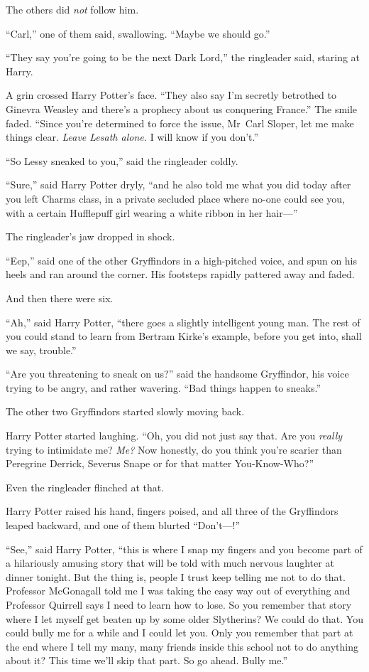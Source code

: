 The others did \emph{not} follow him.

“Carl,” one of them said, swallowing. “Maybe we should go.”

“They say you’re going to be the next Dark Lord,” the ringleader said, staring at Harry.

A grin crossed Harry Potter’s face. “They also say I’m secretly betrothed to Ginevra Weasley and there’s a prophecy about us conquering France.” The smile faded. “Since you’re determined to force the issue, Mr~Carl Sloper, let me make things clear. \emph{Leave Lesath alone.} I will know if you don’t.”

“So Lessy sneaked to you,” said the ringleader coldly.

“Sure,” said Harry Potter dryly, “and he also told me what you did today after you left Charms class, in a private secluded place where no-one could see you, with a certain Hufflepuff girl wearing a white ribbon in her hair—”

The ringleader’s jaw dropped in shock.

“Eep,” said one of the other Gryffindors in a high-pitched voice, and spun on his heels and ran around the corner. His footsteps rapidly pattered away and faded.

And then there were six.

“Ah,” said Harry Potter, “there goes a slightly intelligent young man. The rest of you could stand to learn from Bertram Kirke’s example, before you get into, shall we say, trouble.”

“Are you threatening to sneak on us?” said the handsome Gryffindor, his voice trying to be angry, and rather wavering. “Bad things happen to sneaks.”

The other two Gryffindors started slowly moving back.

Harry Potter started laughing. “Oh, you did not just say that. Are you \emph{really} trying to intimidate me? \emph{Me?} Now honestly, do you think you’re scarier than Peregrine Derrick, Severus Snape or for that matter You-Know-Who?”

Even the ringleader flinched at that.

Harry Potter raised his hand, fingers poised, and all three of the Gryffindors leaped backward, and one of them blurted “Don’t—!”

“See,” said Harry Potter, “this is where I snap my fingers and you become part of a hilariously amusing story that will be told with much nervous laughter at dinner tonight. But the thing is, people I trust keep telling me not to do that. Professor McGonagall told me I was taking the easy way out of everything and Professor Quirrell says I need to learn how to lose. So you remember that story where I let myself get beaten up by some older Slytherins? We could do that. You could bully me for a while and I could let you. Only you remember that part at the end where I tell my many, many friends inside this school not to do anything about it? This time we’ll skip that part. So go ahead. Bully me.”

